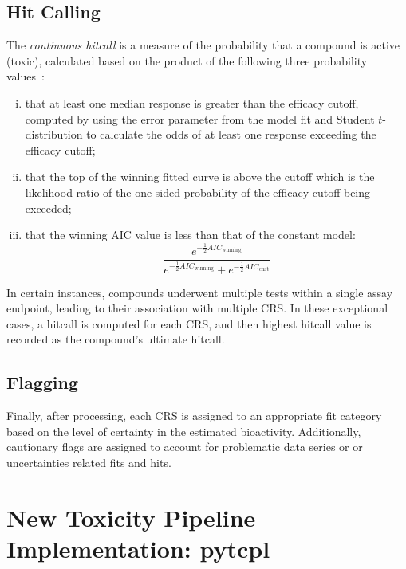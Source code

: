 \subsection{Hit Calling}
The \emph{continuous hitcall} is a measure of the probability that a compound is active (toxic), calculated based on the product of the following three probability values~\cite{sheffield2021}:

\begin{enumerate}[i.]
    \item that at least one median response is greater than the efficacy cutoff, computed by using the error parameter from the model fit and Student $t$-distribution to calculate the odds of at least one response exceeding the efficacy cutoff;
    \item that the top of the winning fitted curve is above the cutoff which is the likelihood ratio of the one-sided probability of the efficacy cutoff being exceeded;
    \item that the winning AIC value is less than that of the constant model:
    \begin{equation}
    \frac{e^{-\frac{1}{2}AIC_{\text{winning}}}}{e^{-\frac{1}{2}AIC_{\text{winning}}} + e^{-\frac{1}{2}AIC_{\text{cnst}}} }
    \end{equation}
\end{enumerate}

In certain instances, compounds underwent multiple tests within a single assay endpoint, leading to their association with multiple CRS. In these exceptional cases, a hitcall is computed for each CRS, and then highest hitcall value is recorded as the compound's ultimate hitcall.

\subsection{Flagging}
Finally, after processing, each CRS is assigned to an appropriate fit category based on the level of certainty in the estimated bioactivity. Additionally, cautionary flags are assigned to account for problematic data series or or uncertainties related fits and hits.


\section{New Toxicity Pipeline Implementation: pytcpl}\label{sec:pytcpl}

